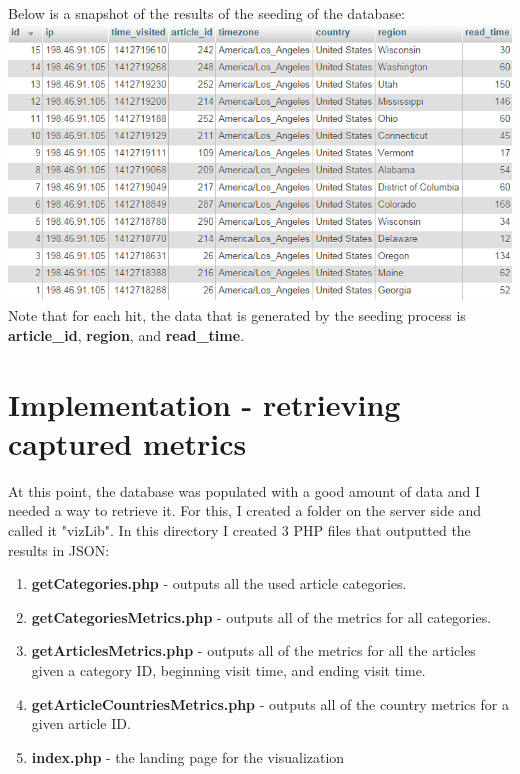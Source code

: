 \documentclass[12pt]{article}
\begin{document}
\noindent Below is a snapshot of the results of the seeding of the database: \\

\noindent\includegraphics[scale=0.8]{img/seeder_mock_hits} \\

\noindent Note that for each hit, the data that is generated by the seeding process is \textbf{article\_id}, \textbf{region}, and \textbf{read\_time}.

\newpage

\section{Implementation - retrieving captured metrics}
At this point, the database was populated with a good amount of data and I needed a way to retrieve it. For this, I created a folder on the server side and called it "vizLib". In this directory I created 3 PHP files that outputted the results in JSON:
\begin{enumerate}
\item{\textbf{getCategories.php} - outputs all the used article categories.}

\item{\textbf{getCategoriesMetrics.php} - outputs all of the metrics for all categories.}

\item{\textbf{getArticlesMetrics.php} - outputs all of the metrics for all the articles given a category ID, beginning visit time, and ending visit time.}

\item{\textbf{getArticleCountriesMetrics.php} - outputs all of the country metrics for a given article ID.}

\item{\textbf{index.php} - the landing page for the visualization}

\end{enumerate}
\end{document}
